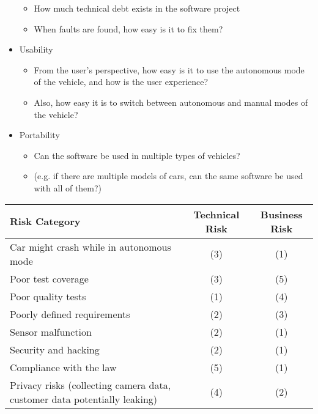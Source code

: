 \documentclass[letterpaper]{article}
\begin{document}
\begin{itemize}
\begin{itemize}
		      \item How much technical debt exists in the software project
		      \item When faults
		            are found, how easy is it to fix them?
	      \end{itemize}
	\item Usability
	      \begin{itemize}
		      \item From the user's perspective, how easy is it to use the autonomous mode of the vehicle, and how is the user experience?
		      \item Also, how easy it is to switch between autonomous and manual modes of the vehicle?
	      \end{itemize}
	\item Portability
	      \begin{itemize}
		      \item Can the software be used in multiple types of vehicles?
		      \item (e.g. if there are multiple models of cars, can the same software be used with all of them?)
	      \end{itemize}
\end{itemize}

\begin{table}[H]
	\centering
	\begin{tabularx}{\textwidth}{X|c|c|}
		Risk Category                                                             & Technical Risk & Business Risk \\ \hline
		Car might crash while in autonomous mode                                  & (3)            & (1)           \\ \hline
		Poor test coverage                                                        & (3)            & (5)           \\ \hline
		Poor quality tests                                                        & (1)            & (4)           \\ \hline
		Poorly defined requirements                                               & (2)            & (3)           \\ \hline
		Sensor malfunction                                                        & (2)            & (1)           \\ \hline
		Security and hacking                                                      & (2)            & (1)           \\ \hline
		Compliance with the law                                                   & (5)            & (1)           \\ \hline
		Privacy risks (collecting camera data, customer data potentially leaking) & (4)            & (2)           \\ \hline
	\end{tabularx}
\end{table}
\end{document}
